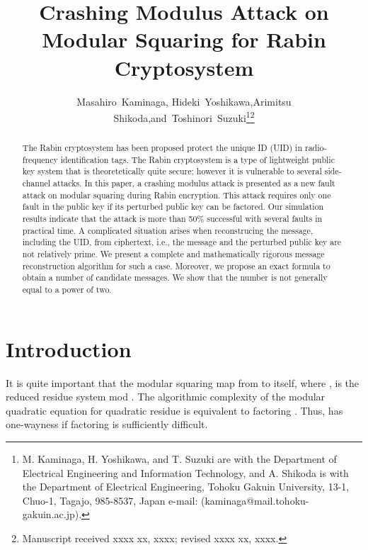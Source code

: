 \documentclass{article}
\begin{document}
\title{Crashing Modulus Attack on Modular Squaring for Rabin Cryptosystem}


\author{Masahiro~Kaminaga, Hideki~Yoshikawa,Arimitsu Shikoda,and~Toshinori~Suzuki\thanks{M. Kaminaga, H. Yoshikawa, and T. Suzuki are with the Department 
of Electrical Engineering and Information Technology, and A. Shikoda is with the Department 
of Electrical Engineering, Tohoku Gakuin University, 
13-1, Chuo-1, Tagajo, 985-8537, Japan e-mail: (kaminaga@mail.tohoku-gakuin.ac.jp).}\thanks{Manuscript received xxxx xx, xxxx; revised xxxx xx, xxxx.}}








\maketitle

\begin{abstract} The Rabin cryptosystem has been proposed protect the unique ID (UID) in
radio-frequency identification tags. 
The Rabin cryptosystem is a type of lightweight public key system that
is theoretetically quite secure; however it is vulnerable 
to several side-channel attacks. 
In this paper, a crashing modulus attack is presented as a new fault attack on
 modular squaring during Rabin encryption.
This attack requires only one fault in the public key if its perturbed public key can be factored. 
Our simulation results indicate that the attack is more than 50\% successful with several faults in practical time.
A complicated situation arises when reconstrucing the message, including the UID, from ciphertext, i.e., 
the message and the perturbed public key are not relatively prime. 
We present a complete and mathematically rigorous 
message reconstruction algorithm for such a case.
Moreover, we propose an exact formula to obtain a number of candidate messages.
We show that the number is not generally equal to a power of two.
\end{abstract}










\section{Introduction}\label{intro}
It is quite important that 
the modular squaring map  from  to itself, 
where , is the reduced residue system mod .
The algorithmic complexity of 
the modular quadratic equation  for quadratic residue  is equivalent to factoring . 
Thus,  has one-wayness if factoring  is sufficiently difficult.
\end{document}
